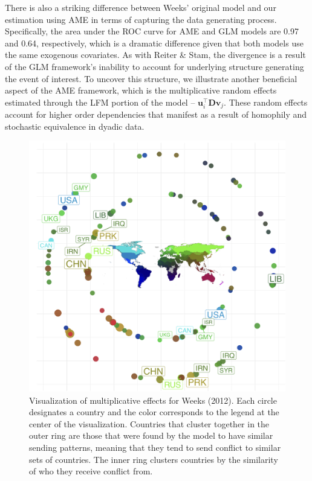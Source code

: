 There is also a striking difference between Weeks' original model and our estimation using AME in terms of capturing the data generating process. Specifically, the area under the ROC curve for AME and GLM models are 0.97 and 0.64, respectively, which is a dramatic difference given that both models use the same exogenous covariates. As with Reiter \& Stam, the divergence is a result of the GLM framework's inability to account for underlying structure generating the event of interest. To uncover this structure, we illustrate another beneficial aspect of the AME framework, which is the multiplicative random effects estimated through the LFM portion of the model -- $\mathbf{u}_{i}^{\top} \mathbf{D} \mathbf{v}_{j}$. These random effects account for higher order dependencies that manifest as a result of homophily and stochastic equivalence in dyadic data.

\begin{figure}[!h]
	\includegraphics[width=\textwidth]{graphics/weeks_circPlot.png}
	\caption{ Visualization of multiplicative effects for Weeks (2012). Each circle designates a country and the color corresponds to the legend at the center of the visualization. Countries that cluster together in the outer ring are those that were found by the model to have similar sending patterns, meaning that they tend to send conflict to similar sets of countries. The inner ring clusters countries by the similarity of who they receive conflict from.
	}
	\label{fig:weekscirc}
\end{figure}
\FloatBarrier

